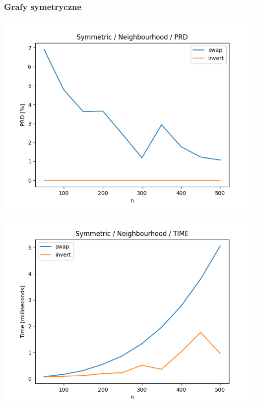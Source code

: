 \documentclass{article}
\begin{document}
\subsubsection{Grafy symetryczne}

\begin{center}
\includegraphics[width=\textwidth, 
                   height = 0.4\textheight, 
                   keepaspectratio]
                  {plots/neighbours_symmetric_prd} 
\end{center}

\begin{center}
\includegraphics[width=\textwidth, 
                   height = 0.4\textheight, 
                   keepaspectratio]
                  {plots/neighbours_symmetric_time} 
\end{center}
\end{document}
